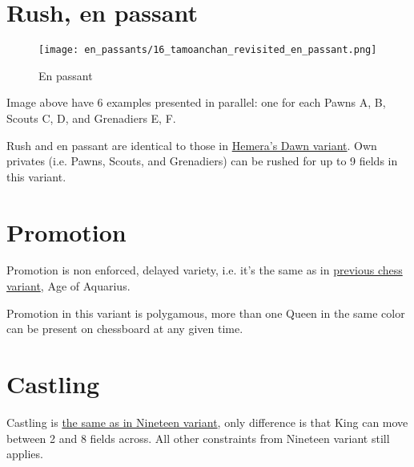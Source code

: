 \section*{Rush, en passant}
\label{sec:Tamoanchan Revisited/Rush, en passant}

\vspace*{-1.4\baselineskip}
\noindent
\begin{figure}[!h]
\texttt{[image: en\_passants/16\_tamoanchan\_revisited\_en\_passant.png]}
\vspace*{-1.3\baselineskip}
\caption{En passant}
\label{fig:16_tamoanchan_revisited_en_passant}
\end{figure}

\vspace*{-0.5\baselineskip}
Image above have 6 examples presented in parallel: one for each Pawns A, B,
Scouts C, D, and Grenadiers E, F.

Rush and en passant are identical to those in
\hyperref[fig:14_hemera_s_dawn_en_passant]{Hemera's Dawn variant}.
Own privates (i.e. Pawns, Scouts, and Grenadiers) can be rushed for up to 9
fields in this variant.

\clearpage %

\section*{Promotion}
\label{sec:Tamoanchan Revisited/Promotion}

Promotion is non enforced, delayed variety, i.e. it's the same as in
\hyperref[sec:Age of Aquarius/Promotion]{previous chess variant}, Age of Aquarius.

Promotion in this variant is polygamous, more than one Queen in the same color
can be present on chessboard at any given time.


\section*{Castling}
\label{sec:Tamoanchan Revisited/Castling}

Castling is
\hyperref[sec:Nineteen/Castling]{the same as in Nineteen variant},
only difference is that King can move
between 2 and 8 fields across. All other constraints from Nineteen variant still
applies.

